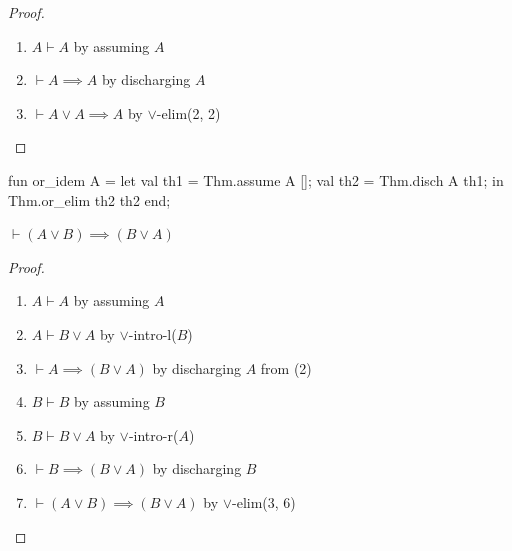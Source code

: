 \begin{proof}
\begin{enumerate}
\item $A\vdash A$ by assuming $A$
\item $\vdash A\implies A$ by discharging $A$
\item $\vdash A\lor A\implies A$ by $\lor$-elim(2, 2)\qedhere
\end{enumerate}
\end{proof}

\nwenddocs{}\endmoddef\nwstartdeflinemarkup{}\nwenddeflinemarkup
fun or_idem A =
  let
    val th1 = Thm.assume A [];
    val th2 = Thm.disch A th1;
  in
    Thm.or_elim th2 th2
  end;
\nwendcode{}\nwdocspar

\begin{node}
$\vdash (A\lor B)\implies(B\lor A)$
\end{node}

\begin{proof}
\begin{enumerate}
\item $A\vdash A$ by assuming $A$
\item $A\vdash B\lor A$ by $\lor$-intro-l($B$)
\item $\vdash A\implies(B\lor A)$ by discharging $A$ from (2)
\item $B\vdash B$ by assuming $B$
\item $B\vdash B\lor A$ by $\lor$-intro-r($A$)
\item $\vdash B\implies(B\lor A)$ by discharging $B$
\item $\vdash(A\lor B)\implies(B\lor A)$ by $\lor$-elim(3, 6)\qedhere
\end{enumerate}
\end{proof}

